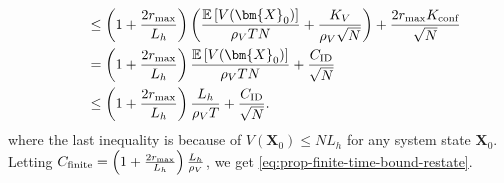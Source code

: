 \documentclass{article}
\theoremstyle{plain}
\theoremstyle{remark}
\newcommand{\E}[1]{\mathbb{E}\left[#1\right]}
\newcommand{\rhov}{\rho_V}
\newcommand{\Kv}{K_V}
\newcommand{\ID}{\textnormal{ID}}
\newcommand{\finite}{\textnormal{finite}}
\def\mX{{\bm{X}}}
\begin{document}
\begin{itemize}
\begin{align}
        \nonumber
            &\qquad \leq \left(1 + \frac{2r_{\max}}{L_h}\right) \left(\frac{\E{V(\mX_0)}}{\rhov TN} + \frac{\Kv}{\rhov\sqrt{N}}\right) + \frac{2r_{\max}K_{\text{conf}}}{\sqrt{N}} \\
        \nonumber
            &\qquad = \left(1 + \frac{2r_{\max}}{L_h}\right) \frac{\E{V(\mX_0)}}{\rhov TN} + \frac{C_{\ID}}{\sqrt{N}} \\
            &\qquad \leq  \left(1 + \frac{2r_{\max}}{L_h}\right) \frac{L_h}{\rhov T} + \frac{C_{\ID}}{\sqrt{N}}.
    \end{align}
    where the last inequality is because of $V(\mX_0) \leq N L_h$ for any system state $\mX_0$. Letting $C_\finite =  \left(1 + \frac{2r_{\max}}{L_h}\right) \frac{L_h}{\rhov}$, we get \eqref{eq:prop-finite-time-bound-restate}. 
    \end{itemize}
\end{document}
